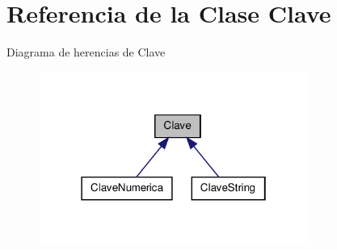 \hypertarget{class_clave}{\section{\-Referencia de la \-Clase \-Clave}
\label{class_clave}
}


\-Diagrama de herencias de \-Clave
\nopagebreak
\begin{figure}[H]
\begin{center}
\leavevmode
\includegraphics[width=250pt]{class_clave__inherit__graph}
\end{center}
\end{figure}
